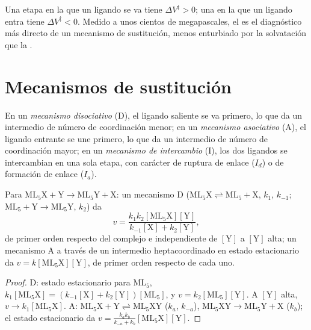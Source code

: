 Una etapa en la que un ligando se va tiene $\Delta V^{\ddagger} > 0$; una en la que un ligando entra tiene $\Delta V^{\ddagger}
< 0$. Medido a unos cientos de megapascales, el  es el diagnóstico más
directo de un mecanismo de sustitución, menos enturbiado por la solvatación que
la .

\section{Mecanismos de sustitución}

\begin{definition}\label{def:b3:complex-mechanisms:mechanisms}
En un \emph{mecanismo disociativo} (D), el ligando
saliente se va primero, lo que da un intermedio de número de coordinación menor; en un
\emph{mecanismo asociativo} (A), el ligando entrante
se une primero, lo que da un intermedio de número de coordinación mayor; en un
\emph{mecanismo de intercambio} (I), los dos ligandos
se intercambian en una sola etapa, con carácter de ruptura de enlace ($I_d$) o de formación de enlace ($I_a$).
\end{definition}

\begin{proposition}\label{prop:b3:complex-mechanisms:d-a-laws}
Para $\mathrm{ML_5X + Y \to ML_5Y + X}$: un mecanismo D ($\mathrm{ML_5X} \rightleftharpoons \mathrm{ML_5} + \mathrm X$, $k_1$, $k_{-1}$; $\mathrm{ML_5} + \mathrm Y
\to \mathrm{ML_5Y}$, $k_2$) da
\[
  v = \frac{k_1k_2[\mathrm{ML_5X}][\mathrm Y]}{k_{-1}[\mathrm X] + k_2[\mathrm Y]},
\]
de primer orden respecto del complejo e independiente de $[\mathrm Y]$ a $[\mathrm Y]$ alta; un mecanismo A
a través de un intermedio heptacoordinado en estado estacionario da $v =
k[\mathrm{ML_5X}][\mathrm Y]$, de primer orden respecto de cada uno.
\end{proposition}

\begin{proof}
D: estado estacionario para $\mathrm{ML_5}$, $k_1[\mathrm{ML_5X}] = (k_{-1}[\mathrm X] + k_2[\mathrm Y])[\mathrm{ML_5}]$, y $v = k_2[\mathrm{ML_5}][\mathrm Y]$.
A $[\mathrm Y]$ alta, $v \to k_1[\mathrm{ML_5X}]$. A: $\mathrm{ML_5X} + \mathrm Y \rightleftharpoons \mathrm{ML_5XY}$ ($k_a$, $k_{-a}$), $\mathrm{ML_5XY} \to
\mathrm{ML_5Y} + \mathrm X$ ($k_b$); el estado estacionario da $v = \frac{k_ak_b}{k_{-a} + k_b}[\mathrm{ML_5X}][\mathrm Y]$.
\end{proof}

